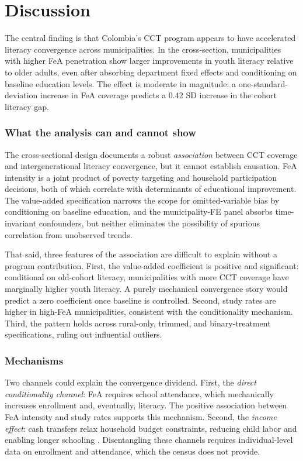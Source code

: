 \documentclass[12pt]{article}
\begin{document}
\section{Discussion}
\label{sec:discussion}

The central finding is that Colombia's CCT program appears to have accelerated literacy convergence across municipalities. In the cross-section, municipalities with higher FeA penetration show larger improvements in youth literacy relative to older adults, even after absorbing department fixed effects and conditioning on baseline education levels. The effect is moderate in magnitude: a one-standard-deviation increase in FeA coverage predicts a 0.42 SD increase in the cohort literacy gap.

\subsubsection*{What the analysis can and cannot show} The cross-sectional design documents a robust \textit{association} between CCT coverage and intergenerational literacy convergence, but it cannot establish causation. FeA intensity is a joint product of poverty targeting and household participation decisions, both of which correlate with determinants of educational improvement. The value-added specification narrows the scope for omitted-variable bias by conditioning on baseline education, and the municipality-FE panel absorbs time-invariant confounders, but neither eliminates the possibility of spurious correlation from unobserved trends.

That said, three features of the association are difficult to explain without a program contribution. First, the value-added coefficient is positive and significant: conditional on old-cohort literacy, municipalities with more CCT coverage have marginally higher youth literacy. A purely mechanical convergence story would predict a zero coefficient once baseline is controlled. Second, study rates are higher in high-FeA municipalities, consistent with the conditionality mechanism. Third, the pattern holds across rural-only, trimmed, and binary-treatment specifications, ruling out influential outliers.

\subsubsection*{Mechanisms} Two channels could explain the convergence dividend. First, the \textit{direct conditionality channel}: FeA requires school attendance, which mechanically increases enrollment and, eventually, literacy. The positive association between FeA intensity and study rates supports this mechanism. Second, the \textit{income effect}: cash transfers relax household budget constraints, reducing child labor and enabling longer schooling \citep{baird2014conditional}. Disentangling these channels requires individual-level data on enrollment and attendance, which the census does not provide.
\end{document}
